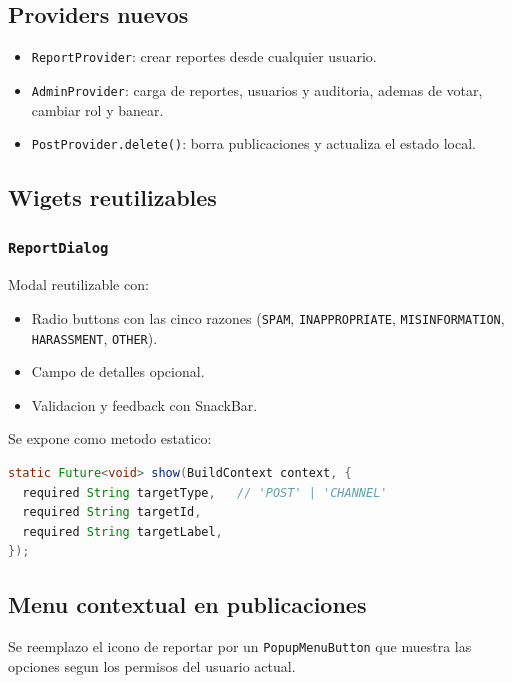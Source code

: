 \subsection{Providers nuevos}

\begin{itemize}[leftmargin=*]
  \item \texttt{ReportProvider}: crear reportes desde cualquier usuario.
  \item \texttt{AdminProvider}: carga de reportes, usuarios y auditoria, ademas de votar, cambiar rol y banear.
  \item \texttt{PostProvider.delete()}: borra publicaciones y actualiza el estado local.
\end{itemize}

\subsection{Wigets reutilizables}

\subsubsection{\texttt{ReportDialog}}

Modal reutilizable con:

\begin{itemize}[leftmargin=*]
  \item Radio buttons con las cinco razones (\texttt{SPAM}, \texttt{INAPPROPRIATE}, \texttt{MISINFORMATION}, \texttt{HARASSMENT}, \texttt{OTHER}).
  \item Campo de detalles opcional.
  \item Validacion y feedback con SnackBar.
\end{itemize}

Se expone como metodo estatico:

\begin{lstlisting}[language=Java]
static Future<void> show(BuildContext context, {
  required String targetType,   // 'POST' | 'CHANNEL'
  required String targetId,
  required String targetLabel,
});
\end{lstlisting}

\subsection{Menu contextual en publicaciones}

Se reemplazo el icono de reportar por un \texttt{PopupMenuButton} que muestra las opciones segun los permisos del usuario actual.

